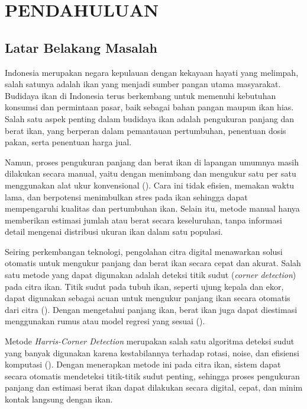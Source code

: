 
\chapter{PENDAHULUAN}

\section{Latar Belakang Masalah}

Indonesia merupakan negara kepulauan dengan kekayaan hayati yang melimpah, salah satunya adalah ikan yang menjadi sumber pangan utama masyarakat. Budidaya ikan di Indonesia terus berkembang untuk memenuhi kebutuhan konsumsi dan permintaan pasar, baik sebagai bahan pangan maupun ikan hias. Salah satu aspek penting dalam budidaya ikan adalah pengukuran panjang dan berat ikan, yang berperan dalam pemantauan pertumbuhan, penentuan dosis pakan, serta penentuan harga jual.

Namun, proses pengukuran panjang dan berat ikan di lapangan umumnya masih dilakukan secara manual, yaitu dengan menimbang dan mengukur satu per satu menggunakan alat ukur konvensional (\cite{Amri2020}). Cara ini tidak efisien, memakan waktu lama, dan berpotensi menimbulkan stres pada ikan sehingga dapat mempengaruhi kualitas dan pertumbuhan ikan. Selain itu, metode manual hanya memberikan estimasi jumlah atau berat secara keseluruhan, tanpa informasi detail mengenai distribusi ukuran ikan dalam satu populasi.

Seiring perkembangan teknologi, pengolahan citra digital menawarkan solusi otomatis untuk mengukur panjang dan berat ikan secara cepat dan akurat. Salah satu metode yang dapat digunakan adalah deteksi titik sudut (\emph{corner detection}) pada citra ikan. Titik sudut pada tubuh ikan, seperti ujung kepala dan ekor, dapat digunakan sebagai acuan untuk mengukur panjang ikan secara otomatis dari citra (\cite{Harris2013}). Dengan mengetahui panjang ikan, berat ikan juga dapat diestimasi menggunakan rumus atau model regresi yang sesuai (\cite{Diansari2013}).

Metode \emph{Harris-Corner Detection} merupakan salah satu algoritma deteksi sudut yang banyak digunakan karena kestabilannya terhadap rotasi, noise, dan efisiensi komputasi (\cite{Harris2013}). Dengan menerapkan metode ini pada citra ikan, sistem dapat secara otomatis mendeteksi titik-titik sudut penting, sehingga proses pengukuran panjang dan estimasi berat ikan dapat dilakukan secara digital, cepat, dan minim kontak langsung dengan ikan.


